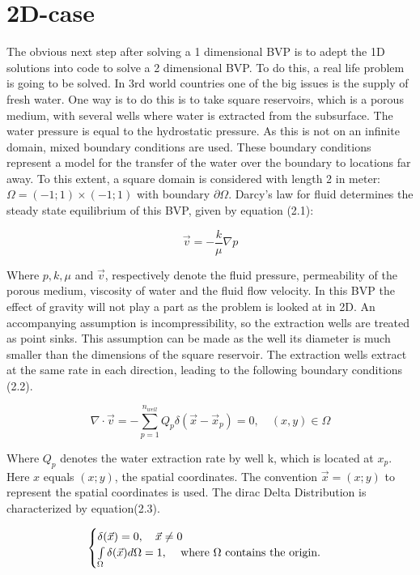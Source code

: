 \documentclass[a4paper]{report}
\begin{document}
\chapter{2D-case}


The obvious next step after solving a 1 dimensional BVP is to adept the 1D solutions into code to solve a 2 dimensional BVP. To do this, a real life problem is going to be solved. In 3rd world countries one of the big issues is the supply of fresh water. One way is to do this is to take square reservoirs, which is a porous medium, with several wells where water is extracted from the subsurface. The water pressure is equal to the hydrostatic pressure. As this is not on an infinite domain, mixed boundary conditions are used. These boundary conditions represent a model for the transfer of the water over the boundary to locations far away. To this extent, a square domain is considered with length 2 in meter: $\Omega= (-1; 1) \times (-1; 1)$ with boundary $\partial\Omega$. Darcy's law for fluid determines the steady state equilibrium of this BVP, given by equation (2.1):

\begin{equation}
\vec{v}=-\frac{k}{\mu}\nabla p
\end{equation}
\medskip

Where $ p, k, \mu$ and $\vec{v}$, respectively denote the 
fluid pressure, permeability of the porous medium, viscosity of water and the fluid flow velocity. In this BVP the effect of gravity will not play a part as the problem is looked at in 2D. An accompanying assumption is incompressibility, so the extraction wells are treated as point sinks. This assumption can be made as the well its diameter is much smaller than the dimensions of the square reservoir. The extraction wells extract at the same rate in each direction, leading to the following boundary conditions (2.2).


\begin{equation}
	\nabla\cdot\vec{v}=-\sum_{p=1}^{n_{well}}Q_p\delta(\vec{x}-\vec{x}_p)=0,\quad (x,y) 	\in\Omega 
\end{equation}

Where $Q_p$ denotes the water extraction rate by well k, which is located at $x_p$. Here $x$ equals $(x;y)$, the spatial coordinates.  The convention $\vec{x} = (x; y) $ to represent the spatial coordinates is used. The dirac Delta Distribution is characterized by equation(2.3).

\begin{equation}
	\begin{cases} 
		\delta(\vec{x}) = 0,\quad  \vec{x} \neq 0 \\
		 \int\limits_{\Omega}\delta(\vec{x})d\Omega = 1, \quad $  where $\Omega $  contains the origin.$
	\end{cases} 
\end{equation}
\end{document}
